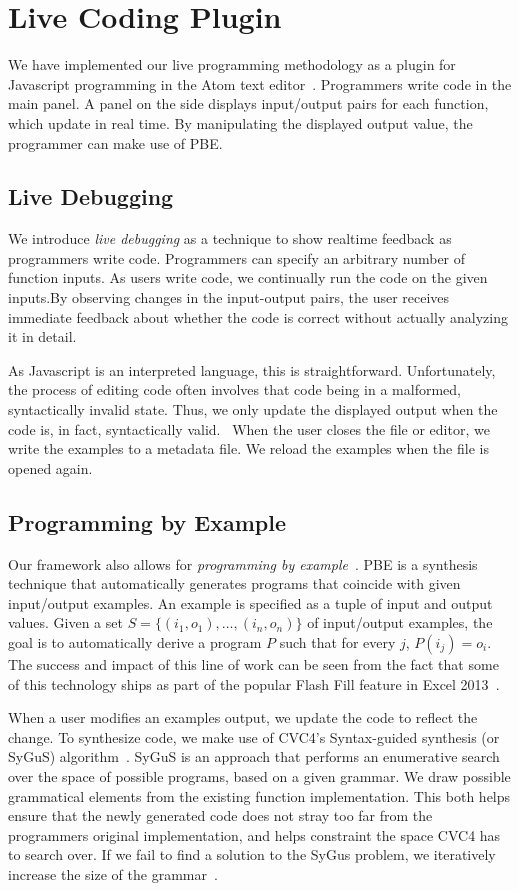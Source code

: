 \section{Live Coding Plugin}
We have implemented our live programming methodology as a plugin
for Javascript programming in the Atom text editor~\cite{Atom}.
Programmers write code in the main panel.
A panel on the side displays input/output pairs for each function,
which update in real time.
By manipulating the displayed output value,
the programmer can make use of PBE.

\subsection{Live Debugging}
We introduce \textit{live debugging} as a technique to show realtime feedback as programmers write code.
Programmers can specify an arbitrary number of function inputs.
As users write code, we continually run the code on the given inputs.By observing changes in the input-output pairs,
the user receives immediate feedback about whether the code is correct without actually analyzing it in detail.

As Javascript is an interpreted language, this is straightforward.
Unfortunately, the process of editing code often involves that code
being in a malformed, syntactically invalid state.
Thus, we only update the displayed output when the code is, in fact,
syntactically valid.~
When the user closes the file or editor,
we write the examples to a metadata file.
We reload the examples when the file is opened again.

\subsection{Programming by Example}
Our framework also allows for \textit{programming by example}~\cite{cypher93,lieberman01,synasc12}.
PBE  is a synthesis technique that automatically generates programs that coincide with given input/output examples. An example is specified as a tuple of input and output values. Given a set $S= \{(i_1, o_1),\ldots, (i_n, o_n)\}$ of input/output examples, the goal is to automatically derive a program $P$ such that for every $j$, $P(i_j) = o_i$. The success and impact of this line of work can be seen from the fact that some of this technology ships as part of the popular Flash Fill feature in Excel 2013~\cite{flashFillPOPL}.

When a user modifies an examples output, we update the code to reflect the change.
To synthesize code, we make use of CVC4's Syntax-guided synthesis (or SyGuS) algorithm~\cite{reynolds2017sygus}.
SyGuS is an approach that performs an enumerative search over the space of possible programs,
based on a given grammar.
We draw possible grammatical elements from the existing function implementation.
This both helps ensure that the newly generated code does not stray too far from the programmers original implementation,
and helps constraint the space CVC4 has to search over.
If we fail to find a solution to the SyGus problem, we iteratively increase the size of the grammar~.

